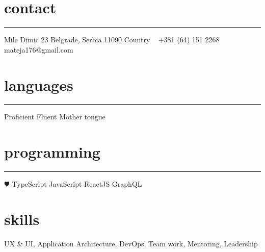 \documentclass[openany]{cv-style}          %
\begin{document}


\begin{aside}
  \section{contact}
  \color{gray} \rule{\textwidth}{0.1mm}
  Mile Dimic 23
  Belgrade, Serbia 11090
  Country
  ~
  +381 (64) 151 2268
  ~
  mateja176@gmail.com
  \section{languages}
  \rule{\textwidth}{0.1mm}
  \space\space\space\space\space\space\space\space\space\space\space\space Proficient
  \space\space\space\space\space\space\space\space\space\space\space\space\space\space\space\space\space\space Fluent
  \space\space Mother tongue
  \section{programming}
  \rule{\textwidth}{0.1mm}
  {\color{blue} $\varheartsuit$} TypeScript
  JavaScript
  ReactJS
  GraphQL
\end{aside}


\section{skills}
\vspace{-0.2cm}

UX \& UI, Application Architecture, DevOps, Team work, Mentoring, Leadership
\end{document}
